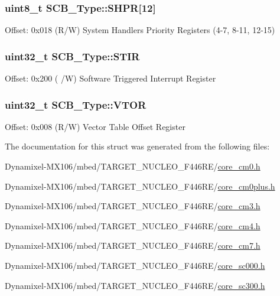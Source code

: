 \subsubsection[{\texorpdfstring{S\+H\+PR}{SHPR}}]{ uint8\+\_\+t S\+C\+B\+\_\+\+Type\+::\+S\+H\+PR\mbox{[}12\mbox{]}}\hypertarget{struct_s_c_b___type_a22b183a9b52ba369209bdb98569b174b}{}\label{struct_s_c_b___type_a22b183a9b52ba369209bdb98569b174b}
Offset\+: 0x018 (R/W) System Handlers Priority Registers (4-\/7, 8-\/11, 12-\/15) 
\subsubsection[{\texorpdfstring{S\+T\+IR}{STIR}}]{ uint32\+\_\+t S\+C\+B\+\_\+\+Type\+::\+S\+T\+IR}\hypertarget{struct_s_c_b___type_afd8149e3b084e2170607dbe64e27b766}{}\label{struct_s_c_b___type_afd8149e3b084e2170607dbe64e27b766}
Offset\+: 0x200 ( /W) Software Triggered Interrupt Register 
\subsubsection[{\texorpdfstring{V\+T\+OR}{VTOR}}]{ uint32\+\_\+t S\+C\+B\+\_\+\+Type\+::\+V\+T\+OR}\hypertarget{struct_s_c_b___type_a0faf96f964931cadfb71cfa54e051f6f}{}\label{struct_s_c_b___type_a0faf96f964931cadfb71cfa54e051f6f}
Offset\+: 0x008 (R/W) Vector Table Offset Register 

The documentation for this struct was generated from the following files\+:\begin{DoxyCompactItemize}
\item 
Dynamixel-\/\+M\+X106/mbed/\+T\+A\+R\+G\+E\+T\+\_\+\+N\+U\+C\+L\+E\+O\+\_\+\+F446\+R\+E/\hyperlink{core__cm0_8h}{core\+\_\+cm0.\+h}\item 
Dynamixel-\/\+M\+X106/mbed/\+T\+A\+R\+G\+E\+T\+\_\+\+N\+U\+C\+L\+E\+O\+\_\+\+F446\+R\+E/\hyperlink{core__cm0plus_8h}{core\+\_\+cm0plus.\+h}\item 
Dynamixel-\/\+M\+X106/mbed/\+T\+A\+R\+G\+E\+T\+\_\+\+N\+U\+C\+L\+E\+O\+\_\+\+F446\+R\+E/\hyperlink{core__cm3_8h}{core\+\_\+cm3.\+h}\item 
Dynamixel-\/\+M\+X106/mbed/\+T\+A\+R\+G\+E\+T\+\_\+\+N\+U\+C\+L\+E\+O\+\_\+\+F446\+R\+E/\hyperlink{core__cm4_8h}{core\+\_\+cm4.\+h}\item 
Dynamixel-\/\+M\+X106/mbed/\+T\+A\+R\+G\+E\+T\+\_\+\+N\+U\+C\+L\+E\+O\+\_\+\+F446\+R\+E/\hyperlink{core__cm7_8h}{core\+\_\+cm7.\+h}\item 
Dynamixel-\/\+M\+X106/mbed/\+T\+A\+R\+G\+E\+T\+\_\+\+N\+U\+C\+L\+E\+O\+\_\+\+F446\+R\+E/\hyperlink{core__sc000_8h}{core\+\_\+sc000.\+h}\item 
Dynamixel-\/\+M\+X106/mbed/\+T\+A\+R\+G\+E\+T\+\_\+\+N\+U\+C\+L\+E\+O\+\_\+\+F446\+R\+E/\hyperlink{core__sc300_8h}{core\+\_\+sc300.\+h}\end{DoxyCompactItemize}
